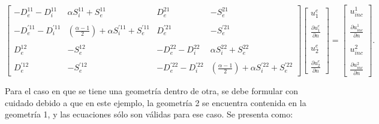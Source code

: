 \documentclass[12pt,letterpaper]{report}
\numberwithin{equation}{section}
\begin{document}
\begin{equation} 
\begin{bmatrix}
-D_{e}^{11} - D_{i}^{11} & \alpha S_{i}^{11} + S_{e}^{11} & D_{e}^{21} & -S_{e}^{21} \\
\\
-D_{e}^{'11} - D_{i}^{'11} & (\frac{\alpha - 1}{2})+\alpha S_{i}^{'11} + S_{e}^{'11} & D_{e}^{'21} & -S_{e}^{'21}\\
\\
D_{e}^{12} & -S_{e}^{12} & -D_{e}^{22} - D_{i}^{22} & \alpha S_{i}^{22} + S_{e}^{22}\\
\\
D_{e}^{'12} & -S_{e}^{'12} & -D_{e}^{'22} - D_{i}^{'22} & (\frac{\alpha - 1}{2})+\alpha S_{i}^{'22} + S_{e}^{'22}
\end{bmatrix}
\begin{bmatrix}
u^{e}_1\\
\\
\frac{\partial u^{e}_1}{\partial n}\\
\\
u^{e}_2\\
\\
\frac{\partial u^{e}_2}{\partial n}
\end{bmatrix}
=
\begin{bmatrix}
u_{inc}^1\\
\\
\frac{\partial u_{inc}^1}{\partial n}\\
\\
u_{inc}^2\\
\\
\frac{\partial u_{inc}^2}{\partial n}
\end{bmatrix}.
\label{eq:multi2_matriz ext}		 
\end{equation} 

Para el caso en que se tiene una geometría dentro de otra, se debe formular con cuidado debido a que en este ejemplo, la geometría 2 se encuentra contenida en la geometría 1, y las ecuaciones sólo son válidas para ese caso. Se presenta como:
\end{document}
